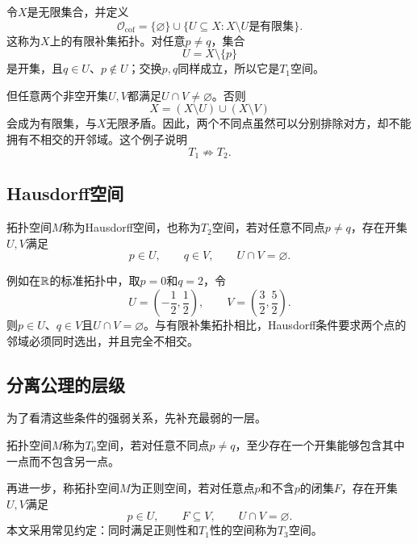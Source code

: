\begin{example}
令$X$是无限集合，并定义
\[
    \mathcal O_{\mathrm{cof}}
    =\{\varnothing\}\cup
    \{U\subseteq X:X\setminus U\text{是有限集}\}.
\]
这称为$X$上的有限补集拓扑。对任意$p\neq q$，集合
\[
    U=X\setminus\{p\}
\]
是开集，且$q\in U$、$p\notin U$；交换$p,q$同样成立，所以它是$T_1$空间。

但任意两个非空开集$U,V$都满足$U\cap V\neq\varnothing$。否则
\[
    X=(X\setminus U)\cup(X\setminus V)
\]
会成为有限集，与$X$无限矛盾。因此，两个不同点虽然可以分别排除对方，却不能拥有不相交的开邻域。这个例子说明
\[
    T_1\not\Rightarrow T_2.
\]
\end{example}

\subsection{Hausdorff空间}

\begin{definition}[Hausdorff空间]
拓扑空间$M$称为Hausdorff空间，也称为$T_2$空间，若对任意不同点$p\neq q$，存在开集$U,V$满足
\[
    p\in U,\qquad q\in V,\qquad U\cap V=\varnothing.
\]
\end{definition}

例如在$\mathbb{R}$的标准拓扑中，取$p=0$和$q=2$，令
\[
    U=\left(-\frac12,\frac12\right),
    \qquad
    V=\left(\frac32,\frac52\right).
\]
则$p\in U$、$q\in V$且$U\cap V=\varnothing$。与有限补集拓扑相比，Hausdorff条件要求两个点的邻域必须同时选出，并且完全不相交。

\subsection{分离公理的层级}

为了看清这些条件的强弱关系，先补充最弱的一层。

\begin{definition}[$T_0$空间]
拓扑空间$M$称为$T_0$空间，若对任意不同点$p\neq q$，至少存在一个开集能够包含其中一点而不包含另一点。
\end{definition}

再进一步，称拓扑空间$M$为正则空间，若对任意点$p$和不含$p$的闭集$F$，存在开集$U,V$满足
\[
    p\in U,
    \qquad
    F\subseteq V,
    \qquad
    U\cap V=\varnothing.
\]
本文采用常见约定：同时满足正则性和$T_1$性的空间称为$T_3$空间。


